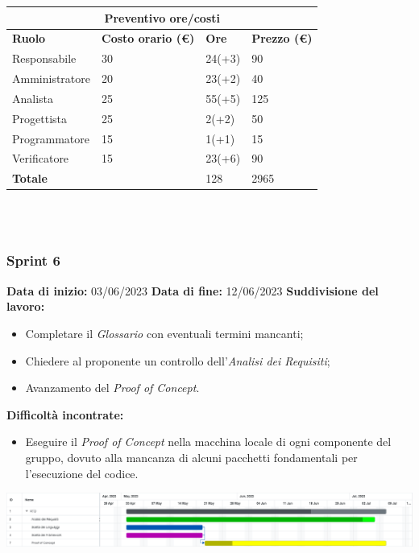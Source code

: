 \documentclass[a4paper, 12pt]{article}
\begin{document}
\begin{center}
	\begin{tabularx}{\textwidth}{|X|X|X|X|}
		\hline
		\multicolumn{4}{|c|}{\textbf{Preventivo ore/costi}}                                      \\
		\hline
		\hline
		\textbf{Ruolo}  & \textbf{Costo orario (\euro)} & \textbf{Ore} & \textbf{Prezzo (\euro)} \\
		\hline
		Responsabile    & 30                            & 24(+3)       & 90                      \\
		\hline
		Amministratore  & 20                            & 23(+2)       & 40                      \\
		\hline
		Analista        & 25                            & 55(+5)       & 125                     \\
		\hline
		Progettista     & 25                            & 2(+2)        & 50                     \\
		\hline
		Programmatore   & 15                            & 1(+1)        & 15                       \\
		\hline
		Verificatore    & 15                            & 23(+6)       & 90                      \\
		\hline
		\hline
		\textbf{Totale} &                               & 128          & 2965                    \\
		\hline
	\end{tabularx}\\[8pt]
	\mbox{}\\
\end{center}

\subsubsection{Sprint 6}
\textbf{Data di inizio:} 03/06/2023\newline
\textbf{Data di fine:} 12/06/2023\newline
\newline
\textbf{Suddivisione del lavoro:}
\begin{itemize}
    \item Completare il \textit{Glossario} con eventuali termini mancanti;
    \item Chiedere al proponente un controllo dell'\textit{Analisi dei Requisiti};
    \item Avanzamento del \textit{Proof of Concept}.
\end{itemize}
\textbf{Difficoltà incontrate:}
\begin{itemize}
    \item Eseguire il \textit{Proof of Concept} nella macchina locale di ogni componente del gruppo, dovuto alla mancanza di alcuni pacchetti fondamentali per l'esecuzione del codice.
\end{itemize}
\includegraphics[scale=0.24]{RTB_5.png}\newline
\newline
\end{document}
